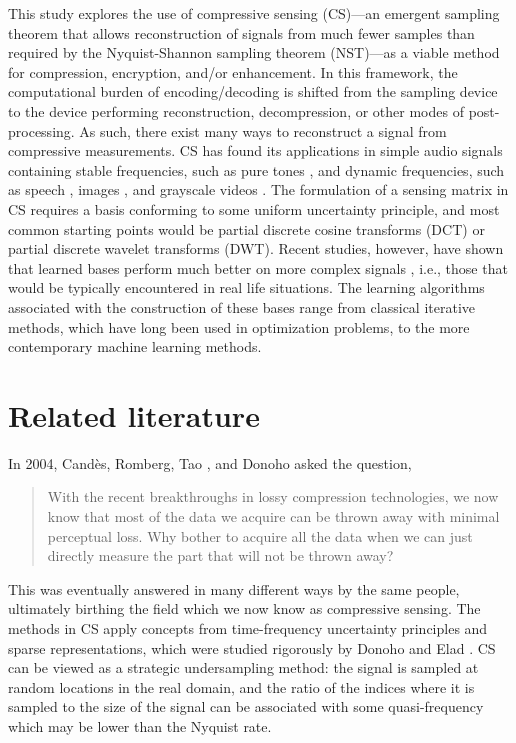 This study explores the use of compressive sensing (CS)---an emergent sampling theorem that allows reconstruction of signals from much fewer samples than required by the Nyquist-Shannon sampling theorem (NST)---as a viable method for compression, encryption, and/or enhancement. In this framework, the computational burden of encoding/decoding is shifted from the sampling device to the device performing reconstruction, decompression, or other modes of post-processing. As such, there exist many ways to reconstruct a signal from compressive measurements. CS has found its applications in simple audio signals containing stable frequencies, such as pure tones \cite{Mathew2016,Andras2018}, and dynamic frequencies, such as speech \cite{Low2013,Low2018,Abrol2015}, images \cite{Mo2013,Zhou2016,Romero2016}, and grayscale videos \cite{Liu2014,Chen2014}. The formulation of a sensing matrix in CS requires a basis conforming to some uniform uncertainty principle, and most common starting points would be partial discrete cosine transforms (DCT) or partial discrete wavelet transforms (DWT). Recent studies, however, have shown that learned bases perform much better on more complex signals \cite{Liu2013,Sharma2018,Eslahi2016}, i.e., those that would be typically encountered in real life situations. The learning algorithms associated with the construction of these bases range from classical iterative methods, which have long been used in optimization problems, to the more contemporary machine learning methods.


\section{Related literature}
\label{sec:rrl}
In 2004, Cand\`{e}s, Romberg, Tao \cite{Candes2006}, and Donoho \cite{Donoho2006} asked the question, 

\begin{quote}
	With the recent breakthroughs in lossy compression technologies, we now know that most of the data we acquire can be thrown away with minimal perceptual loss. Why bother to acquire all the data when we can just directly measure the part that will not be thrown away?
\end{quote}

\noindent This was eventually answered in many different ways by the same people, ultimately birthing the field which we now know as compressive sensing. The methods in CS apply concepts from time-frequency uncertainty principles \cite{Donoho2001} and sparse representations, which were studied rigorously by Donoho and Elad \cite{Donoho2003}. CS can be viewed as a strategic undersampling method: the signal is sampled at random locations in the real domain, and the ratio of the indices where it is sampled to the size of the signal can be associated with some quasi-frequency which may be lower than the Nyquist rate.

